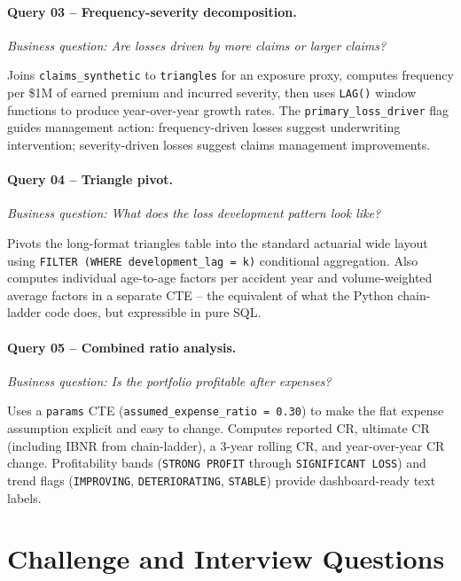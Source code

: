 \paragraph{Query 03 -- Frequency-severity decomposition.}
\emph{Business question: Are losses driven by more claims or larger claims?}

Joins \texttt{claims\_synthetic} to \texttt{triangles} for an exposure proxy,
computes frequency per \$1M of earned premium and incurred severity, then
uses \texttt{LAG()} window functions to produce year-over-year growth rates.
The \texttt{primary\_loss\_driver} flag guides management action:
frequency-driven losses suggest underwriting intervention; severity-driven
losses suggest claims management improvements.

\paragraph{Query 04 -- Triangle pivot.}
\emph{Business question: What does the loss development pattern look like?}

Pivots the long-format triangles table into the standard actuarial wide
layout using \texttt{FILTER (WHERE development\_lag = k)} conditional
aggregation.  Also computes individual age-to-age factors per accident year
and volume-weighted average factors in a separate CTE -- the equivalent of
what the Python chain-ladder code does, but expressible in pure SQL.

\paragraph{Query 05 -- Combined ratio analysis.}
\emph{Business question: Is the portfolio profitable after expenses?}

Uses a \texttt{params} CTE (\texttt{assumed\_expense\_ratio = 0.30}) to
make the flat expense assumption explicit and easy to change.  Computes
reported CR, ultimate CR (including IBNR from chain-ladder), a 3-year rolling
CR, and year-over-year CR change.  Profitability bands (\texttt{STRONG PROFIT}
through \texttt{SIGNIFICANT LOSS}) and trend flags (\texttt{IMPROVING},
\texttt{DETERIORATING}, \texttt{STABLE}) provide dashboard-ready text labels.

\section{Challenge and Interview Questions}
\label{sec:ins-questions}

